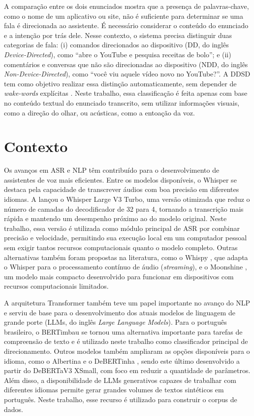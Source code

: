 \documentclass[
    12pt,                %
    openright,           %
    oneside,             %
    a4paper,             %
    english,             %
    brazil               %
]{abntex2}
\begin{document}
A comparação entre os dois enunciados mostra que a presença de palavras-chave, como o nome de um aplicativo ou site, não é suficiente para determinar se uma fala é direcionada ao assistente. É necessário considerar o conteúdo do enunciado e a intenção por trás dele. Nesse contexto, o sistema precisa distinguir duas categorias de fala: (i) comandos direcionados ao dispositivo (DD, do inglês \textit{Device-Directed}), como ``abre o YouTube e pesquisa receitas de bolo''; e (ii) comentários e conversas que não são direcionadas ao dispositivo (NDD, do inglês \textit{Non-Device-Directed}), como ``você viu aquele vídeo novo no YouTube?''. A DDSD tem como objetivo realizar essa distinção automaticamente, sem depender de \textit{wake-words} explícitas \cite{Mallidi2018, Wagner2024}. Neste trabalho, essa classificação é feita apenas com base no conteúdo textual do enunciado transcrito, sem utilizar informações visuais, como a direção do olhar, ou acústicas, como a entoação da voz.

\section{Contexto}
\label{sec:contexto}

Os avanços em ASR e NLP têm contribuído para o desenvolvimento de assistentes de voz mais eficientes. Entre os modelos disponíveis, o Whisper \cite{Radford2023} se destaca pela capacidade de transcrever áudios com boa precisão em diferentes idiomas. A  lançou o Whisper Large V3 Turbo, uma versão otimizada que reduz o número de camadas do decodificador de 32 para 4, tornando a transcrição mais rápida e mantendo um desempenho próximo ao do modelo original. Neste trabalho, essa versão é utilizada como módulo principal de ASR por combinar precisão e velocidade, permitindo sua execução local em um computador pessoal sem exigir tantos recursos computacionais quanto o modelo completo. Outras alternativas também foram propostas na literatura, como o Whispy \cite{Bevilacqua2024}, que adapta o Whisper para o processamento contínuo de áudio (\textit{streaming}), e o Moonshine \cite{Jeffries2024}, um modelo mais compacto desenvolvido para funcionar em dispositivos com recursos computacionais limitados.

A arquitetura Transformer \cite{Vaswani2017} também teve um papel importante no avanço do NLP e serviu de base para o desenvolvimento dos atuais modelos de linguagem de grande porte (LLMs, do inglês \textit{Large Language Models}). Para o português brasileiro, o BERTimbau \cite{Souza2020} se tornou uma alternativa importante para tarefas de compreensão de texto e é utilizado neste trabalho como classificador principal de direcionamento. Outros modelos também ampliaram as opções disponíveis para o idioma, como o Albertina \cite{Rodrigues2023, Santos2024} e o DeBERTinha \cite{Campiotti2023}, sendo este último desenvolvido a partir do DeBERTaV3 XSmall, com foco em reduzir a quantidade de parâmetros. Além disso, a disponibilidade de LLMs generativos capazes de trabalhar com diferentes idiomas permite gerar grandes volumes de textos sintéticos em português. Neste trabalho, esse recurso é utilizado para construir o corpus de dados.
\end{document}
